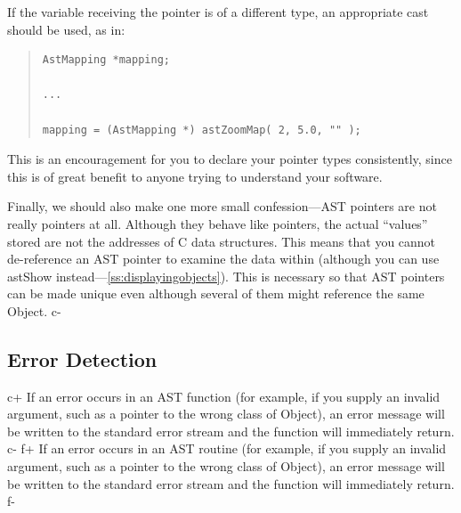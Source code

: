 \documentclass[twoside,11pt]{article}
\newcommand{\secref}[1]{\S\ref{#1}}
\renewcommand{\secref}[1]{\ref{#1}}
\begin{document}
If the variable receiving the pointer is of a different type, an
appropriate cast should be used, as in:

\begin{quote}
\small
\begin{verbatim}
AstMapping *mapping;

...

mapping = (AstMapping *) astZoomMap( 2, 5.0, "" );
\end{verbatim}
\normalsize
\end{quote}

This is an encouragement for you to declare your pointer types
consistently, since this is of great benefit to anyone trying to
understand your software.

Finally, we should also make one more small confession---AST pointers
are not really pointers at all.  Although they behave like pointers,
the actual ``values'' stored are not the addresses of C data
structures. This means that you cannot de-reference an AST pointer to
examine the data within (although you can use astShow
instead---\secref{ss:displayingobjects}). This is necessary so that AST
pointers can be made unique even although several of them might
reference the same Object.
c-

\subsection{\label{ss:errordetection}Error Detection}

c+
If an error occurs in an AST function (for example, if you supply an
invalid argument, such as a pointer to the wrong class of Object), an
error message will be written to the standard error stream and the
function will immediately return.
c-
f+
If an error occurs in an AST routine (for example, if you supply an
invalid argument, such as a pointer to the wrong class of Object), an
error message will be written to the standard error stream and the
function will immediately return.
f-
\end{document}
